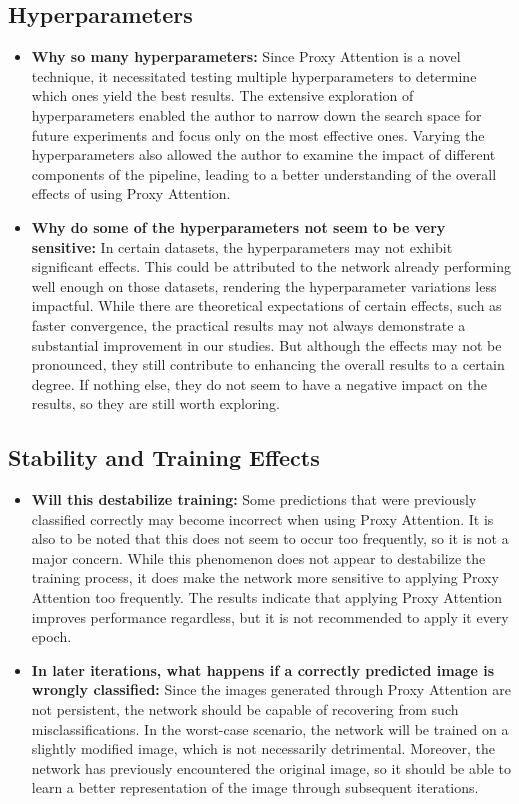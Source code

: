 \subsection{Hyperparameters}
\begin{itemize}
    \item \textbf{Why so many hyperparameters: } Since Proxy Attention is a novel technique, it necessitated testing multiple hyperparameters to determine which ones yield the best results. The extensive exploration of hyperparameters enabled the author to narrow down the search space for future experiments and focus only on the most effective ones. Varying the hyperparameters also allowed the author to examine the impact of different components of the pipeline, leading to a better understanding of the overall effects of using Proxy Attention.

    \item \textbf{Why do some of the hyperparameters not seem to be very sensitive: } In certain datasets, the hyperparameters may not exhibit significant effects. This could be attributed to the network already performing well enough on those datasets, rendering the hyperparameter variations less impactful. While there are theoretical expectations of certain effects, such as faster convergence, the practical results may not always demonstrate a substantial improvement in our studies. But although the effects may not be pronounced, they still contribute to enhancing the overall results to a certain degree. If nothing else, they do not seem to have a negative impact on the results, so they are still worth exploring.
\end{itemize}

\subsection{Stability and Training Effects}
\begin{itemize}
    \item \textbf{Will this destabilize training: } Some predictions that were previously classified correctly may become incorrect when using Proxy Attention. It is also to be noted that this does not seem to occur too frequently, so it is not a major concern. While this phenomenon does not appear to destabilize the training process, it does make the network more sensitive to applying Proxy Attention too frequently. The results indicate that applying Proxy Attention improves performance regardless, but it is not recommended to apply it every epoch. 

    \item \textbf{In later iterations, what happens if a correctly predicted image is wrongly classified: } Since the images generated through Proxy Attention are not persistent, the network should be capable of recovering from such misclassifications. In the worst-case scenario, the network will be trained on a slightly modified image, which is not necessarily detrimental. Moreover, the network has previously encountered the original image, so it should be able to learn a better representation of the image through subsequent iterations.

\end{itemize}

